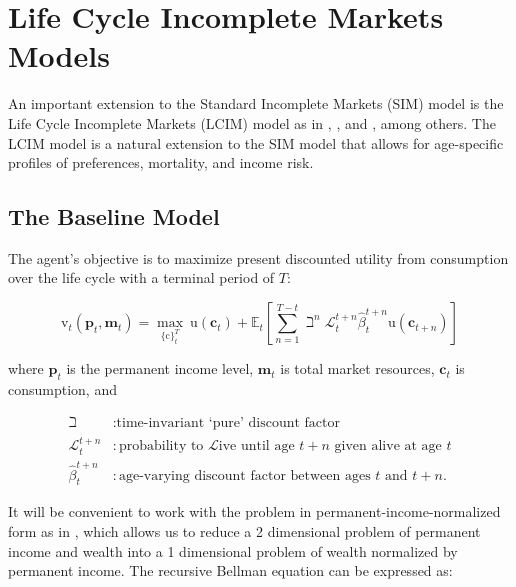 \documentclass{article}
\newcommand{\DiscFac}{\beta}
\newcommand{\cFunc}{\mathrm{c}}
\newcommand{\uFunc}{\mathrm{u}}
\newcommand{\vFunc}{\mathrm{v}}
\newcommand{\Alive}{\mathcal{L}}
\newcommand{\cLvl}{\mathbf{c}}
\newcommand{\mLvl}{\mathbf{m}}
\newcommand{\pLvl}{\mathbf{p}}
\newcommand{\Ex}{\mathbb{E}}
\begin{document}
\section{Life Cycle Incomplete Markets Models}\label{Life Cycle Incomplete Markets Models}

An important extension to the Standard Incomplete Markets (SIM) model is the Life Cycle Incomplete Markets (LCIM) model as in \cite{Cagetti_2003}, \cite{Gourinchas_2002}, and \cite{Palumbo_1999}, among others. The LCIM model is a natural extension to the SIM model that allows for age-specific profiles of preferences, mortality, and income risk.

\subsection{The Baseline Model}\label{The Baseline Model}

The agent's objective is to maximize present discounted utility from consumption over the life cycle with a terminal period of $T$:

\begin{equation}
\label{eq:lifecyclemax}
\vFunc_{t}(\pLvl_{t},\mLvl_{t})  =    \max_{\{\cFunc\}_{t}^{T}} ~ \uFunc(\cLvl_{t})+\Ex_{t}\left[\sum_{n=1}^{T-t} {\beth}^{n} \Alive_{t}^{t+n}\hat{\DiscFac}_{t}^{t+n} \uFunc(\cLvl_{t+n}) \right]
\end{equation}

where $\pLvl_{t}$ is the permanent income level, $\mLvl_{t}$ is total market resources, $\cLvl_{t}$ is consumption, and

\begin{equation}
\begin{align}
    \beth & :  \text{time-invariant `pure' discount factor}
    \\ \Alive _{t}^{t+n} & :  \text{probability to }\Alive\text{ive until age $t+n$ given alive at age $t$}
    \\ \hat{\DiscFac}_{t}^{t+n} & :  \text{age-varying discount factor between ages $t$ and $t+n$.}
\end{align}
\end{equation}

It will be convenient to work with the problem in permanent-income-normalized form as in \cite{Carroll_2004}, which allows us to reduce a 2 dimensional problem of permanent income and wealth into a 1 dimensional problem of wealth normalized by permanent income. The recursive Bellman equation can be expressed as:
\end{document}
